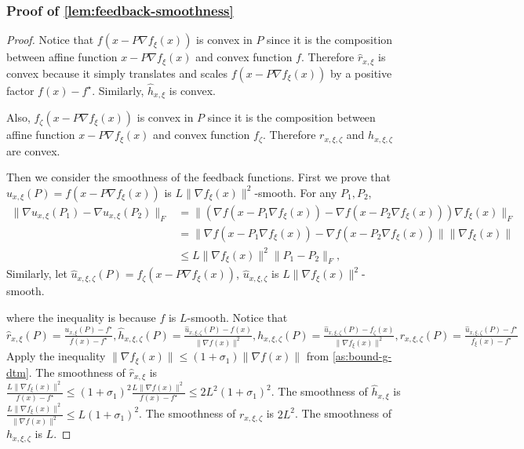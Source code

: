\documentclass{article}
\theoremstyle{definition}
\begin{document}
\subsubsection{Proof of \cref{lem:feedback-smoothness}}
\begin{proof}
  Notice that $f (x - P \nabla f_{\xi } (x))$ is convex in $P$ since it is the
  composition between affine function $x - P \nabla f_{\xi} (x)$ and convex
  function $f$. Therefore $\hat{r}_{x, \xi}$ is convex because it simply
  translates and scales $f (x - P \nabla f_{\xi } (x))$ by a positive factor
  $f (x) - f^{\star}$. Similarly, $\hat{h}_{x, \xi}$ is convex.
  
  Also, $f_{\zeta}  (x - P \nabla f_{\xi} (x))$ is convex in $P$ since it is
  the composition between affine function $x - P \nabla f_{\xi} (x)$ and
  convex function $f_{\zeta}$. Therefore $r_{x, \xi, \zeta}$ and $h_{x, \xi,
  \zeta}$ are convex.
  
  Then we consider the smoothness of the feedback functions. First we prove
  that $u_{x, \xi} (P) = f (x - P \nabla f_{\xi } (x))$ is $L \| \nabla
  f_{\xi} (x)\|^2 $-smooth. For any $P_1, P_2$,
  \begin{align*}
    \| \nabla u_{x, \xi} (P_1) - \nabla u_{x, \xi} (P_2) \|_F &{}= \| (\nabla
    f (x - P_1 \nabla f_{\xi } (x)) - \nabla f (x - P_2 \nabla f_{\xi } (x)))
    \nabla f_{\xi } (x) \|_F\\
    &{}= \| \nabla f (x - P_1 \nabla f_{\xi } (x)) - \nabla f (x - P_2
    \nabla f_{\xi } (x)) \|  \| \nabla f_{\xi } (x) \|\\
    &{}\leq L \| \nabla f_{\xi } (x) \|^2  \| P_1 - P_2 \|_F,
  \end{align*}
  Similarly, let $\hat{u}_{x, \xi, \zeta} (P) = f_{\zeta} (x - P \nabla f_{\xi
  } (x))$, $\hat{u}_{x, \xi, \zeta}$ is $L \| \nabla f_{\xi} (x)\|^2 $-smooth.
  
  where the inequality is because $f$ is $L$-smooth. Notice that
  \[ \hat{r}_{x, \xi} (P) = \tfrac{u_{x, \xi} (P) - f^{\star}}{f (x) -
     f^{\star}}, \hat{h}_{x, \xi, \zeta} (P) = \tfrac{\hat{u}_{x, \xi, \zeta} (P)
     - f (x)}{\| \nabla f (x) \|^2}, h_{x, \xi, \zeta} (P) =
     \tfrac{\hat{u}_{x, \xi, \zeta} (P) - f_{\zeta} (x)}{\| \nabla f_{\xi} (x)
     \|^2}, r_{x, \xi, \zeta} (P) = \tfrac{\hat{u}_{x, \xi, \zeta} (P) -
     f^{\star}}{f_{\xi} (x) - f^{\star}} \]
  Apply the inequality $\| \nabla f_{\xi} (x)\| \leq (1 + \sigma_1) \|
  \nabla f (x) \|$ from \cref{as:bound-g-dtm}. The smoothness of $\hat{r}_{x, \xi}$ is $\tfrac{L \|
  \nabla f_{\xi} (x)\|^2}{f (x) - f^{\star}} \leq (1 + \sigma_1)^2 \tfrac{L \|
  \nabla f (x)\|^2}{f (x) - f^{\star}} \leq 2 L^2 (1 + \sigma_1)^2$. The
  smoothness of $\hat{h}_{x, \xi}$ is $\tfrac{L \| \nabla f_{\xi} (x)\|^2}{\|
  \nabla f (x) \|^2} \leq L (1 + \sigma_1)^2$. The smoothness of $r_{x, \xi,
  \zeta}$ is $2 L^2$. The smoothness of $h_{x, \xi, \zeta}$ is $L$.
  

\end{proof}
\end{document}
